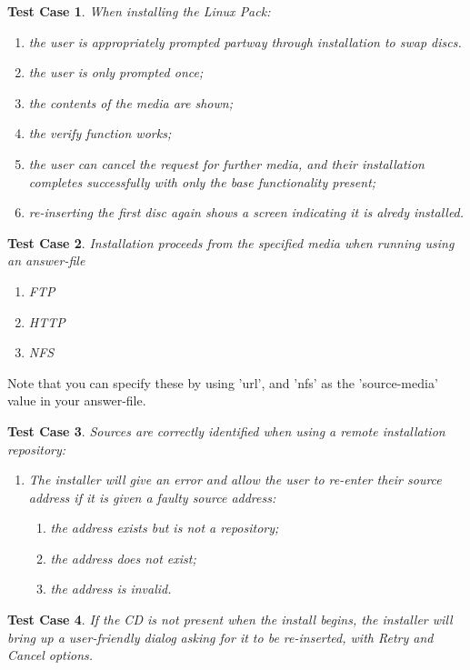 \documentclass[a4paper]{article}
\newtheorem{testcase}{Test Case}
\begin{document}
\begin{testcase}
When installing the Linux Pack:
\begin{enumerate}
\item the user is appropriately prompted partway through installation
to swap discs.
\item the user is only prompted once;
\item the contents of the media are shown;
\item the verify function works;
\item the user can cancel the request for further media, and their
  installation completes successfully with only the base functionality
  present;
\item re-inserting the first disc again shows a screen indicating it
  is alredy installed.
\end{enumerate}
\end{testcase}

\begin{testcase}
Installation proceeds from the specified media when running using an
answer-file
\begin{enumerate}
\item FTP
\item HTTP
\item NFS
\end{enumerate}
\end{testcase}
Note that you can specify these by using 'url', and 'nfs' as
the 'source-media' value in your answer-file.

\begin{testcase}
Sources are correctly identified when using a remote installation
repository:
\begin{enumerate}
\item The installer will give an error and allow the user to re-enter
  their source address if it is given a faulty source address:
  \begin{enumerate}
  \item the address exists but is not a repository;
  \item the address does not exist;
  \item the address is invalid.
  \end{enumerate}
\end{enumerate}
\end{testcase}

\begin{testcase}
If the CD is not present when the install begins, the installer will
bring up a user-friendly dialog asking for it to be re-inserted, with
Retry and Cancel options.
\end{testcase}
\end{document}
